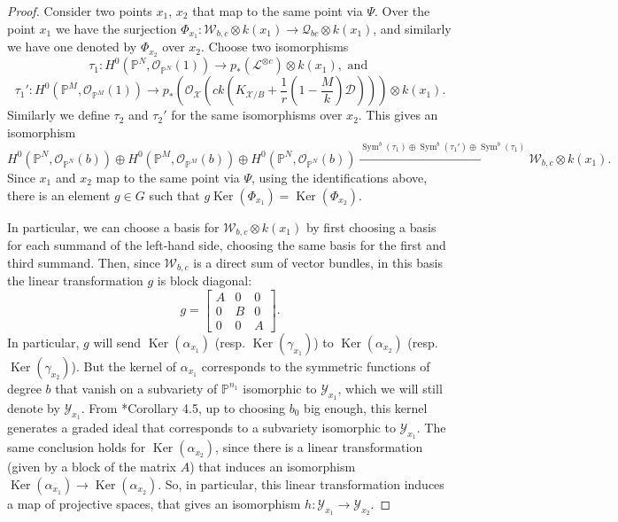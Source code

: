 \documentclass{amsart}
\newcommand{\bP}{\mathbb{P}}
\newcommand{\cQ}{\mathcal{Q}}
\newcommand{\cD}{\mathcal{D}}
\newcommand{\cL}{\mathcal{L}}
\newcommand{\cO}{\mathcal{O}}
\newcommand{\cW}{\mathcal{W}}
\newcommand{\cX}{\mathcal{X}}
\newcommand{\cY}{\mathcal{Y}}
\newcommand{\Ker}{\operatorname{Ker}}
\newcommand{\Sym}{\operatorname{Sym}}
\theoremstyle{definition}
\begin{document}
\begin{proof}
Consider two points $x_1$, $x_2$ that map to the same point via $\Psi$.
Over the point $x_1$ we have the surjection $\Phi_{x_1} \colon \cW_{b,c}\otimes k(x_1)\to \cQ_{bc}\otimes k(x_1)$, and similarly we have one denoted by $\Phi_{x_2}$ over $x_2$.
Choose two isomorphisms
\[
\tau_1 \colon H^0(\bP^{N}, \cO_{\bP^{N}}(1)) \to p_*(\cL^{\otimes c})\otimes k(x_1), \text{ and }
\]
\[
\tau_1' \colon H^0(\bP^{M}, \cO_{\bP^{M}}(1)) \to  p_*(\cO_\cX(ck(K_{\cX/B} + \frac{1}{r}(1-\frac{M}{k})\cD)))  \otimes k(x_1).
\]
Similarly we define  $\tau_2$ and $\tau_2'$ for the same isomorphisms over $x_2$.
This gives an isomorphism
\[
H^0(\bP^{N}, \cO_{\bP^{N}}(b)) \oplus H^0(\bP^{M}, \cO_{\bP^{M}}(b)) \oplus H^0(\bP^{N}, \cO_{\bP^{N}}(b)) \xrightarrow{\Sym^b(\tau_1) \oplus \Sym^b(\tau_1') \oplus \Sym^b(\tau_1)} \cW_{b,c}\otimes k(x_1).
\]
Since $x_1$ and $x_2$ map to the same point via $\Psi$, using the identifications above, there is an element $g\in G$ such that $g\Ker( \Phi_{x_1}) =\Ker(\Phi_{x_2}) $.

In particular, we can choose a basis for $\cW_{b,c}\otimes k(x_1)$ by first choosing a basis for each summand of the left-hand side, choosing the same basis for the first and third summand.
Then, since $\cW_{b,c}$ is a direct sum of vector bundles, in this basis the linear transformation $g$ is block diagonal:
\[
g = \begin{bmatrix}A & 0 & 0 \\ 0 & B & 0 \\ 0 & 0 & A\end{bmatrix}.
\]
In particular, $g$ will send $\Ker(\alpha_{x_1})$ (resp. $\Ker(\gamma_{x_1})$) to $\Ker(\alpha_{x_2})$ (resp. $\Ker(\gamma_{x_2})$).
But the kernel of $\alpha_{x_1}$ corresponds to the symmetric functions of degree $b$ that vanish on a subvariety of $\bP^{n_1}$ isomorphic to $\cY_{x_1}$, which we will still denote by $\cY_{x_1}$.
From \cite{ACH11}*{Corollary 4.5}, up to choosing $b_0$ big enough, this kernel generates a graded ideal that corresponds to a subvariety isomorphic to $\cY_{x_1}$.
The same conclusion holds for $\Ker(\alpha_{x_2})$, since there is a linear transformation (given by a block of the matrix $A$) that induces an isomorphism $\Ker(\alpha_{x_1})\to \Ker(\alpha_{x_2})$.
So, in particular, this linear transformation induces a map of projective spaces, that gives an isomorphism $h \colon \cY_{x_1}\to \cY_{x_2}$.


\end{proof}
\end{document}
